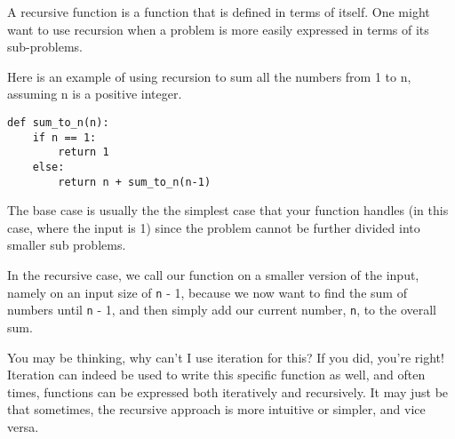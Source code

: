 A recursive function is a function that is defined in terms of itself. One might want to use recursion when a problem is more easily expressed in terms of its sub-problems. 

Here is an example of using recursion to sum all the numbers from 1 to n, assuming n is a positive integer.

\begin{lstlisting}
def sum_to_n(n):
    if n == 1:
        return 1
    else:
        return n + sum_to_n(n-1)
\end{lstlisting}

The base case is usually the the simplest case that your function handles (in this case, where the input is 1) since the problem cannot be further divided into smaller sub problems.

In the recursive case, we call our function on a smaller version of the input, namely on an input size of \texttt{n} - 1, because we now want to find the sum of numbers until \texttt{n} - 1, and then simply add our current number, \texttt{n}, to the overall sum. 

You may be thinking, why can't I use iteration for this? If you did, you're right! Iteration can indeed be used to write this specific function as well, and often times, functions can be expressed both iteratively and recursively. It may just be that sometimes, the recursive approach is more intuitive or simpler, and vice versa.
